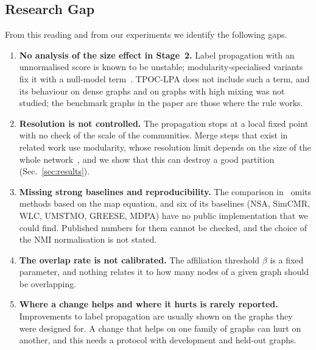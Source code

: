 \documentclass[conference]{IEEEtran}
\begin{document}
\subsection{Research Gap}\label{sec:gap}
From this reading and from our experiments we identify the following gaps.
\begin{enumerate}
\item \textbf{No analysis of the size effect in Stage~2.} Label propagation with an unnormalised score is known to be unstable; modularity-specialised variants fix it with a null-model term~\cite{barber2009}. TPOC-LPA does not include such a term, and its behaviour on dense graphs and on graphs with high mixing was not studied; the benchmark graphs in the paper are those where the rule works.
\item \textbf{Resolution is not controlled.} The propagation stops at a local fixed point with no check of the scale of the communities. Merge steps that exist in related work use modularity, whose resolution limit depends on the size of the whole network~\cite{fortunato2007}, and we show that this can destroy a good partition (Sec.~\ref{sec:results}).
\item \textbf{Missing strong baselines and reproducibility.} The comparison in~\cite{kong2026} omits methods based on the map equation, and six of its baselines (NSA, SimCMR, WLC, UMSTMO, GREESE, MDPA) have no public implementation that we could find. Published numbers for them cannot be checked, and the choice of the NMI normalisation is not stated.
\item \textbf{The overlap rate is not calibrated.} The affiliation threshold $\beta$ is a fixed parameter, and nothing relates it to how many nodes of a given graph should be overlapping.
\item \textbf{Where a change helps and where it hurts is rarely reported.} Improvements to label propagation are usually shown on the graphs they were designed for. A change that helps on one family of graphs can hurt on another, and this needs a protocol with development and held-out graphs.
\end{enumerate}
\end{document}
